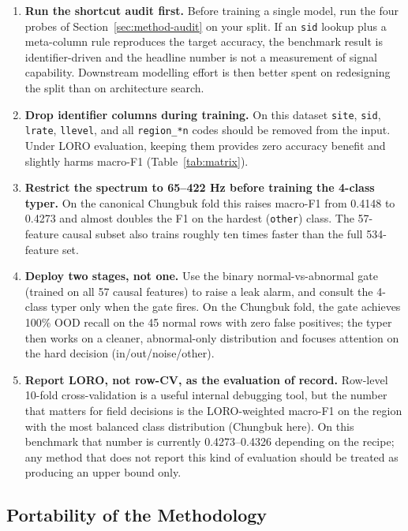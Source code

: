 \documentclass[sensors,article,submit,pdftex,oneauthor]{Definitions/mdpi}
\begin{document}
\begin{enumerate}
\item \textbf{Run the shortcut audit first.} Before training a
single model, run the four probes of
Section~\ref{sec:method-audit} on your split. If an \texttt{sid}
lookup plus a meta-column rule reproduces the target accuracy,
the benchmark result is identifier-driven and the headline
number is not a measurement of signal capability. Downstream
modelling effort is then better spent on redesigning the split
than on architecture search.

\item \textbf{Drop identifier columns during training.} On this
dataset \texttt{site}, \texttt{sid}, \texttt{lrate},
\texttt{llevel}, and all \texttt{region\_*n} codes should be
removed from the input. Under LORO evaluation, keeping them
provides zero accuracy benefit and slightly harms macro-F1
(Table~\ref{tab:matrix}).

\item \textbf{Restrict the spectrum to 65--422 Hz before
training the 4-class typer.} On the canonical Chungbuk fold
this raises macro-F1 from 0.4148 to 0.4273 and almost doubles
the F1 on the hardest (\texttt{other}) class. The 57-feature
causal subset also trains roughly ten times faster than the
full 534-feature set.

\item \textbf{Deploy two stages, not one.} Use the binary
normal-vs-abnormal gate (trained on all 57 causal features) to
raise a leak alarm, and consult the 4-class typer only when
the gate fires. On the Chungbuk fold, the gate achieves 100\%
OOD recall on the 45 normal rows with zero false positives;
the typer then works on a cleaner, abnormal-only distribution
and focuses attention on the hard decision (in/out/noise/other).

\item \textbf{Report LORO, not row-CV, as the evaluation of
record.} Row-level 10-fold cross-validation is a useful
internal debugging tool, but the number that matters for field
decisions is the LORO-weighted macro-F1 on the region with
the most balanced class distribution (Chungbuk here). On this
benchmark that number is currently 0.4273--0.4326 depending
on the recipe; any method that does not report this kind of
evaluation should be treated as producing an upper bound only.
\end{enumerate}

\subsection{Portability of the Methodology}
\end{document}
